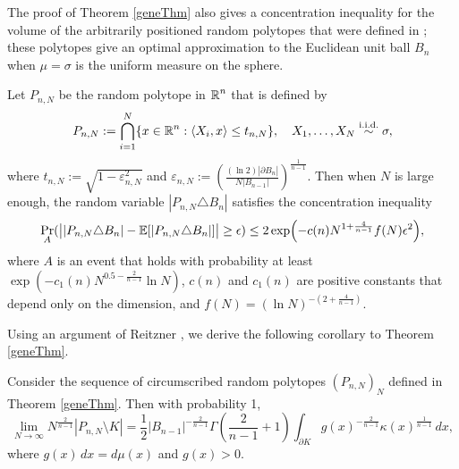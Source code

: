 The proof of Theorem \ref{geneThm} also gives a concentration inequality for the volume of the arbitrarily positioned random polytopes that were defined in \cite{kur2017approximation}; these polytopes give an optimal approximation to the Euclidean unit ball $B_n$ when $\mu=\sigma$ is the uniform measure on the sphere.
\begin{corollary}{\label{mainThm}}
	Let $ P_{n,N} $ be the random polytope in $ \operatorname{\mathbb{R}}^{n} $ that is defined by
	\[
	P_{n,N} := \bigcap_{i=1}^{N}\{x\in\R^n: \inneri{X_i}{x} \leq t_{n,N} \}, 
	\quad X_1,\ldots,X_N \stackrel{\text{i.i.d.}}{\sim}  \sigma,%
	\] 
	where $t_{n,N} := {\sqrt{1-\varepsilon_{n,N}^2}}$ and $\varepsilon_{n,N} := \left(\frac{(\ln 2)|\partial B_n|}{N|B_{n-1}|}\right)^{\frac{1}{n-1}}$.	 
	Then when $N$ is large enough, the random variable $|P_{n,N} \triangle B_n|$ satisfies the concentration inequality
	\[
	\Pr_A(\big||P_{n,N}\triangle B_n|-\E[|P_{n,N}\triangle B_n|]\big| \geq \epsilon) 
	\leq 2\exp\left(-c(n)N^{1+\frac{4}{n-1}}f(N)\epsilon^2\right),
	\]
	where $A$ is an event that holds with probability at least $\exp\left(-c_1(n)N^{0.5-\frac{2}{n-1}}\ln N\right)$, $c(n)$ and $c_1(n)$ are positive constants that depend only on the dimension, and $ f(N)=(\ln N)^{-(2+\frac{4}{n-1})}$. %
\end{corollary}

Using %
 an argument of Reitzner \cite{reitzner2003random}, we derive the following corollary to Theorem \ref{geneThm}.
\begin{corollary}\label{corollary10}
	Consider the sequence of circumscribed random polytopes $(P_{n,N})_{N}$ defined  in Theorem \ref{geneThm}. Then with probability 1,
	\[
	\lim_{N\to\infty} N^{\frac{2}{n-1}}|P_{n,N}\setminus  K| = \frac{1}{2}|B_{n-1}|^{-\frac{2}{n-1}} \Gamma\left(\frac{2}{n-1}+1\right)\int_{\partial K}g(x)^{-\frac{2}{n-1}} \kappa(x)^{\frac{1}{n-1}} \,dx,
	\] 
	where $g(x)\,dx = d\mu(x)$ and $g(x)>0$.
\end{corollary}


